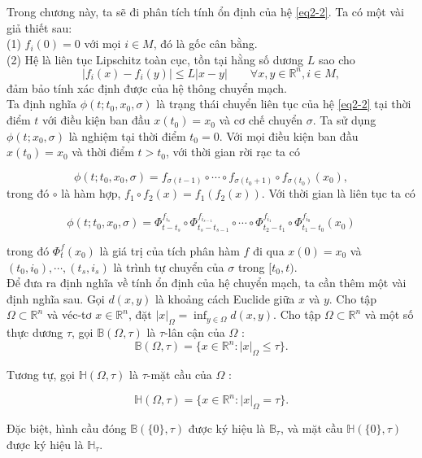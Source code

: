 \documentclass[14pt,a4paper,oneside]{report}		%
\begin{document}
Trong chương này, ta sẽ đi phân tích tính ổn định của hệ \ref{eq2-2}. Ta có một vài giả thiết sau:\\
(1) $f_i(0)=0$ với mọi $i\in M$, đó là gốc cân bằng.\\
(2) Hệ là liên tục Lipschitz toàn cục, tồn tại hằng số dương $L$ sao cho
\begin{equation} \label{eq2-3}
|f_i(x)-f_i(y)|\leq L|x-y|\qquad \forall x,y \in \mathbb{R}^n, i\in M,
\end{equation}
đảm bảo tính xác định được của hệ thông chuyển mạch.\\
Ta định nghĩa $\phi (t;t_0,x_0,\sigma)$ là trạng thái chuyển liên tục của hệ \ref{eq2-2} tại thời điểm $t$ với điều kiện ban đầu $x(t_0)=x_0$ và cơ chế chuyển $\sigma$. Ta sử dụng $\phi (t;x_0,\sigma)$ là nghiệm tại thời điểm $t_0 = 0$. Với mọi điều kiện ban đầu $x(t_0)=x_0$ và thời điểm $t>t_0$, với thời gian rời rạc ta có

\begin{equation} \label{eq2-4}
\phi (t;t_0,x_0,\sigma)=f_{\sigma (t-1)}\circ \cdots \circ f_{\sigma (t_0+1)}\circ f_{\sigma (t_0)}(x_0),
\end{equation}
trong đó $\circ$ là hàm hợp, $f_1 \circ f_2(x) = f_1(f_2(x))$. Với thời gian là liên tục ta có

\begin{equation} \label{eq2-5}
\phi (t;t_0,x_0,\sigma )=\Phi^{f_{i_s}}_{t-t_s}\circ\Phi^{f_{i_{s-1}}}_{t_s-t_{s-1}}\circ\cdots\circ\Phi^{f_{i_{1}}}_{t_2-t_{1}}\circ\Phi^{f_{i_{0}}}_{t_1-t_{0}}(x_0)
\end{equation}

trong đó $\Phi^f_t(x_0)$ là giá trị của tích phân hàm $f$ đi qua $x(0)=x_0$ và $(t_0,i_0),\cdots ,(t_s,i_s)$ là trình tự chuyển của $\sigma$ trong $[t_0,t)$.\\
Để đưa ra định nghĩa về tính ổn định của hệ chuyển mạch, ta cần thêm một vài định nghĩa sau. Gọi $d(x,y)$ là khoảng cách Euclide giữa $x$ và $y$. Cho tập $\Omega \subset\mathbb{R}^n$ và véc-tơ $x\in\mathbb{R}^n$, đặt $|x|_\Omega = \inf_{y\in\Omega}d(x,y)$. Cho tập $\Omega\subset\mathbb{R}^n$ và một số thực dương $\tau$, gọi $\mathbb{B}(\Omega , \tau)$ là $\tau$-lân cận của $\Omega$ :
$$\mathbb{B}(\Omega,\tau)=\{x\in\mathbb{R}^n:|x|_\Omega\leq\tau\}.$$

Tương tự, gọi $\mathbb{H}(\Omega,\tau)$ là $\tau$-mặt cầu của $\Omega$ :

$$\mathbb{H}(\Omega,\tau)=\{x\in\mathbb{R}^n:|x|_\Omega=\tau\}.$$

Đặc biệt, hình cầu đóng $\mathbb{B}(\{0\},\tau)$ được ký hiệu là $\mathbb{B}_\tau$, và mặt cầu $\mathbb{H}(\{0\},\tau)$ được ký hiệu là $\mathbb{H}_\tau$.
\end{document}
